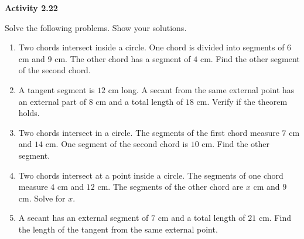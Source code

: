 \vspace{0.3ex}
\noindent\textbf{Activity 2.22}

\vspace{0.2ex}

Solve the following problems. Show your solutions.

\begin{enumerate}
    \item Two chords intersect inside a circle. One chord is divided into segments of $6$ cm and $9$ cm. The other chord has a segment of $4$ cm. Find the other segment of the second chord.
    \item A tangent segment is $12$ cm long. A secant from the same external point has an external part of $8$ cm and a total length of $18$ cm. Verify if the theorem holds.
    \item Two chords intersect in a circle. The segments of the first chord measure $7$ cm and $14$ cm. One segment of the second chord is $10$ cm. Find the other segment.
    \item Two chords intersect at a point inside a circle. The segments of one chord measure $4$ cm and $12$ cm. The segments of the other chord are $x$ cm and $9$ cm. Solve for $x$.
    \item A secant has an external segment of $7$ cm and a total length of $21$ cm. Find the length of the tangent from the same external point.
\end{enumerate}
